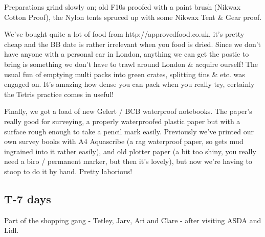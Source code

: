 Preparations grind slowly on; old F10s proofed with a paint brush
(Nikwax Cotton Proof), the Nylon tents spruced up with some Nikwax
Tent \& Gear proof.

We’ve bought quite a lot of food from http://approvedfood.co.uk, it’s
pretty cheap and the BB date is rather irrelevant when you food is
dried. Since we don’t have anyone with a personal car in London,
anything we can get the postie to bring is something we don’t have to
trawl around London \& acquire ourself! The usual fun of emptying multi
packs into green crates, splitting tins \& etc. was engaged on. It’s
amazing how dense you can pack when you really try, certainly the
Tetris practice comes in useful!

Finally, we got a load of new Gelert / BCB waterproof notebooks.
The paper’s really good for surveying, a properly waterproofed plastic
paper but with a surface rough enough to take a pencil mark easily.
Previously we’ve printed our own survey books with A4 Aquascribe
(a rag waterproof paper, so gets mud ingrained into it rather easily),
and old plotter paper (a bit too shiny, you really need a biro /
permanent marker, but then it's lovely), but now we’re having to stoop
to do it by hand. Pretty laborious! 

\newpage

\subsection{T-7 days}


\begin{marginfigure}
\checkoddpage \ifoddpage \forcerectofloat \else \forceversofloat \fi
\centering
 \caption{Part of the shopping gang - Tetley, Jarv, Ari and Clare - after visiting ASDA and Lidl. }
 \label{food 2011}
\end{marginfigure}

